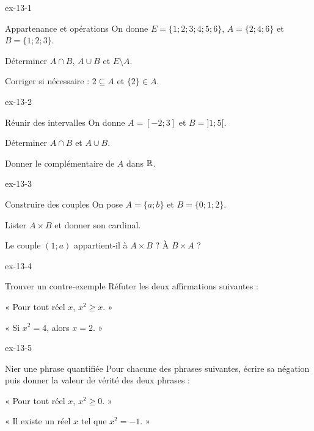 \begin{blocLivre}{ex-13-1}
\begin{exercice}[1]{Appartenance et opérations}
On donne $E=\{1;2;3;4;5;6\}$, $A=\{2;4;6\}$ et $B=\{1;2;3\}$.\begin{questions}
\item Déterminer $A\cap B$, $A\cup B$ et $E\setminus A$.
\item Corriger si nécessaire : $2\subseteq A$ et $\{2\}\in A$.
\end{questions}
\end{exercice}
\end{blocLivre}
\begin{blocLivre}{ex-13-2}
\begin{exercice}[1]{Réunir des intervalles}
On donne $A=[-2;3]$ et $B=]1;5[$.\begin{questions}
\item Déterminer $A\cap B$ et $A\cup B$.
\item Donner le complémentaire de $A$ dans $\mathbb{R}$.
\end{questions}
\label{figlivre-r13-02-intervalles-ex}

\end{exercice}
\end{blocLivre}
\begin{blocLivre}{ex-13-3}
\begin{exercice}[1]{Construire des couples}
On pose $A=\{a;b\}$ et $B=\{0;1;2\}$.\begin{questions}
\item Lister $A\times B$ et donner son cardinal.
\item Le couple $(1;a)$ appartient-il à $A\times B$ ? À $B\times A$ ?
\end{questions}
\end{exercice}
\end{blocLivre}
\begin{blocLivre}{ex-13-4}
\begin{exercice}[1]{Trouver un contre-exemple}
Réfuter les deux affirmations suivantes :\begin{questions}
\item « Pour tout réel $x$, $x^2\geq x$. »
\item « Si $x^2=4$, alors $x=2$. »
\end{questions}
\end{exercice}
\end{blocLivre}
\begin{blocLivre}{ex-13-5}
\begin{exercice}[1]{Nier une phrase quantifiée}
Pour chacune des phrases suivantes, écrire sa négation puis donner la valeur de vérité des deux phrases :\begin{questions}
\item « Pour tout réel $x$, $x^2\geq0$. »
\item « Il existe un réel $x$ tel que $x^2=-1$. »
\end{questions}
\end{exercice}
\end{blocLivre}
